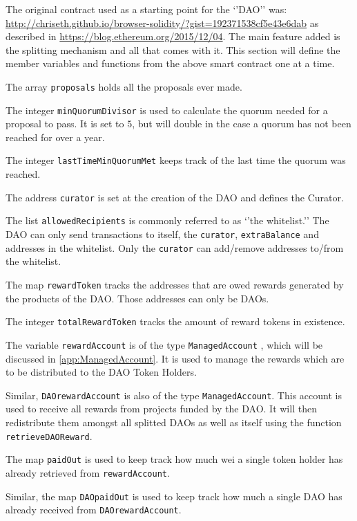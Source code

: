 \documentclass[9pt,oneside]{amsart}
\begin{document}
\begin{multicols}{2}
The original contract used as a starting point for the ‘’DAO’’ was: \url{http://chriseth.github.io/browser-solidity/?gist=192371538cf5e43e6dab} as described in 
\url{https://blog.ethereum.org/2015/12/04}. The main feature added is the splitting mechanism and all that comes with it.
This section will define the member variables and functions from the above smart contract one at a time. 

The array \verb|proposals| holds all the proposals ever made. 

The integer \verb|minQuorumDivisor| is used to calculate the quorum needed for a proposal to pass. It is set to $5$, but will double in the case a quorum has not been reached for over a year.

The integer \verb|lastTimeMinQuorumMet| keeps track of the last time the quorum was reached.

The address \verb|curator| is set at the creation of the DAO and defines the Curator. 

The list \verb|allowedRecipients| is commonly referred to as ‘’the whitelist.’’ The DAO can only send transactions to itself, the \verb|curator|, \verb|extraBalance| and addresses in the whitelist. Only the \verb|curator| can add/remove addresses to/from the whitelist. 

The map \verb|rewardToken| tracks the addresses that are owed rewards generated by the products of the DAO. Those addresses can only be DAOs.

The integer \verb|totalRewardToken| tracks the amount of reward tokens in existence.

The variable \verb|rewardAccount| is of the type \verb|ManagedAccount| , which will be discussed in \ref{app:ManagedAccount}. It is used to manage the rewards which are to be distributed to the DAO Token Holders.

Similar, \verb|DAOrewardAccount| is also of the type \verb|ManagedAccount|. This account is used to receive all rewards from projects funded by the DAO. It will then redistribute them amongst all splitted DAOs as well as itself using the function \verb|retrieveDAOReward|.

The map \verb|paidOut| is used to keep track how much wei a single token holder has already retrieved from \verb|rewardAccount|. 

Similar, the map \verb|DAOpaidOut| is used to keep track how much a single DAO has already received from \verb|DAOrewardAccount|.


\end{multicols}
\end{document}
